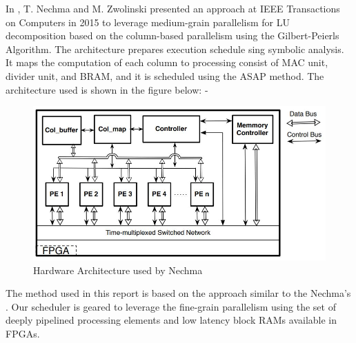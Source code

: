 In \cite{Nechma}, T. Nechma and M. Zwolinski presented an approach at IEEE Transactions on Computers in 2015  to leverage medium-grain parallelism for LU decomposition based on the column-based parallelism using the Gilbert-Peierls Algorithm. The architecture prepares execution schedule sing symbolic analysis. It maps the computation of each column to processing consist of MAC unit, divider unit, and BRAM, and it is scheduled using the ASAP method. The architecture used is shown in the figure below: -
\begin{figure}[H]
    \centering
    \includegraphics[width = 0.5\linewidth]{./ReviewLit/nechmasArchitecture.JPG}
    \caption{Hardware Architecture used by Nechma \cite{Nechma}}
    \label{fig:Intro:nechma}
\end{figure}
The method used in this report is based on the approach similar to the Nechma's \cite{Nechma}. Our scheduler is geared to leverage the fine-grain parallelism using the set of deeply pipelined processing elements and low latency block RAMs available in FPGAs. 